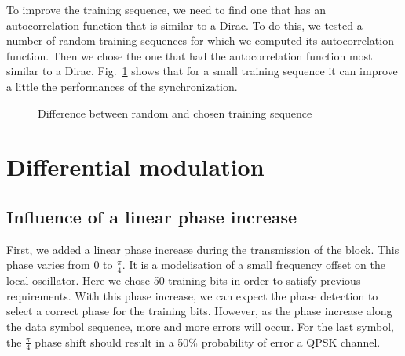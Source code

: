 \documentclass[a4paper,12pt]{article}
\begin{document}
To improve the training sequence, we need to find one that has an autocorrelation function that is similar to a Dirac. To do this, we tested a number of random training sequences for which we computed its autocorrelation function. Then we chose the one that had the autocorrelation function most similar to a Dirac. Fig.~\ref{train} shows that for a small training sequence it can improve a little the performances of the synchronization.

\begin{figure}[ht!]
\caption{Difference between random and chosen training sequence}
\label{train}
\end{figure}

\newpage
\section{Differential modulation}
\subsection{Influence of a linear phase increase}
First, we added a linear phase increase during the transmission of the block. This phase varies from $0$ to $\frac{\pi}{4}$. It is a modelisation of a small frequency offset on the local oscillator. Here we chose 50 training bits in order to satisfy previous requirements. With this phase increase, we can expect the phase detection to select a correct phase for the training bits. However, as the phase increase along the data symbol sequence, more and more errors will occur. For the last symbol, the $\frac{\pi}{4}$ phase shift should result in a 50\% probability of error a QPSK channel.\\
\end{document}
